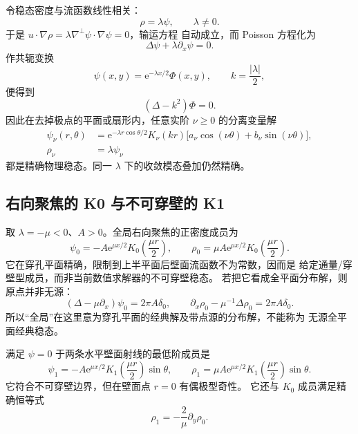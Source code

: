\documentclass[11pt,a4paper,fontset=fandol]{ctexart}
\newcommand{\e}{\mathrm e}
\newcommand{\grad}{\nabla}
\newcommand{\perpgrad}{\nabla^\perp}
\newcommand{\abs}[1]{\left\lvert #1\right\rvert}
\begin{document}
令稳态密度与流函数线性相关：
\begin{equation}
  \rho=\lambda\psi,\qquad \lambda\ne0.
  \label{eq:rho-lambda-psi}
\end{equation}
于是 $u\cdot\grad\rho=\lambda\perpgrad\psi\cdot\grad\psi=0$，输运方程
自动成立，而 Poisson 方程化为
\begin{equation}
  \Delta\psi+\lambda\partial_x\psi=0.
  \label{eq:drift-helmholtz}
\end{equation}
作共轭变换
\begin{equation}
  \psi(x,y)=\e^{-\lambda x/2}\Phi(x,y),
  \qquad k=\frac{\abs\lambda}{2},
\end{equation}
便得到
\begin{equation}
  (\Delta-k^2)\Phi=0.
\end{equation}
因此在去掉极点的平面或扇形内，任意实阶 $\nu\ge0$ 的分离变量解
\begin{align}
  \psi_\nu(r,\theta)
  &=\e^{-\lambda r\cos\theta/2}K_\nu(kr)
    \bigl[a_\nu\cos(\nu\theta)+b_\nu\sin(\nu\theta)\bigr],
  \\
  \rho_\nu&=\lambda\psi_\nu
  \label{eq:bessel-family}
\end{align}
都是精确物理稳态。同一 $\lambda$ 下的收敛模态叠加仍然精确。

\subsection{右向聚焦的 K0 与不可穿壁的 K1}

取 $\lambda=-\mu<0$、$A>0$。全局右向聚焦的正密度成员为
\begin{equation}
  \psi_0=-A\e^{\mu x/2}K_0\!\left(\frac{\mu r}{2}\right),
  \qquad
  \rho_0=\mu A\e^{\mu x/2}K_0\!\left(\frac{\mu r}{2}\right).
  \label{eq:k0}
\end{equation}
它在穿孔平面精确，限制到上半平面后壁面流函数不为常数，因而是
给定通量/穿壁型成员，而非当前数值求解器的不可穿壁稳态。
若把它看成全平面分布解，则原点并非无源：
\begin{equation}
  (\Delta-\mu\partial_x)\psi_0=2\pi A\delta_0,
  \qquad
  \partial_x\rho_0-\mu^{-1}\Delta\rho_0=2\pi A\delta_0.
  \label{eq:k0-point-source}
\end{equation}
所以“全局”在这里意为穿孔平面的经典解及带点源的分布解，不能称为
无源全平面经典稳态。

满足 $\psi=0$ 于两条水平壁面射线的最低阶成员是
\begin{equation}
  \psi_1=-A\e^{\mu x/2}K_1\!\left(\frac{\mu r}{2}\right)\sin\theta,
  \qquad
  \rho_1=\mu A\e^{\mu x/2}K_1\!\left(\frac{\mu r}{2}\right)\sin\theta.
  \label{eq:k1}
\end{equation}
它符合不可穿壁边界，但在壁面点 $r=0$ 有偶极型奇性。
它还与 $K_0$ 成员满足精确恒等式
\begin{equation}
  \rho_1=-\frac{2}{\mu}\partial_y\rho_0.
  \label{eq:k1-derivative}
\end{equation}
\end{document}
